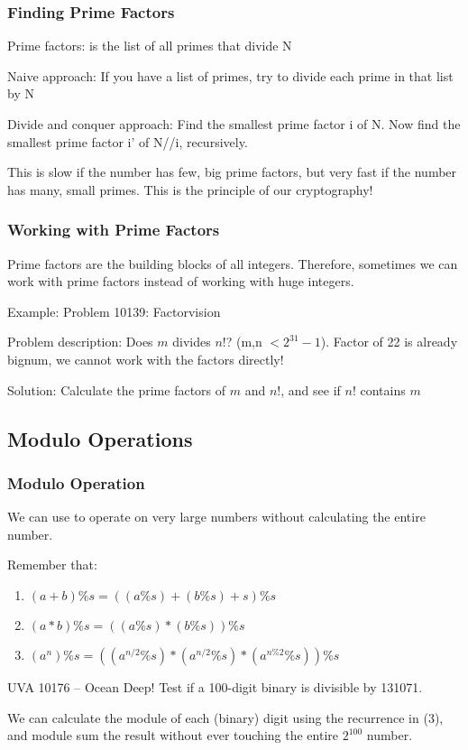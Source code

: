 \documentclass{beamer}
\begin{document}
\begin{frame}
  \frametitle{Finding Prime Factors}

  Prime factors: is the list of all primes that divide N

  Naive approach: If you have a list of primes, try to divide each
  prime in that list by N

  Divide and conquer approach: Find the smallest prime factor i of
  N. Now find the smallest prime factor i' of N//i, recursively.

  This is slow if the number has few, big prime factors, but very fast
  if the number has many, small primes. This is the principle of our
  cryptography!
\end{frame}

\begin{frame}
  \frametitle{Working with Prime Factors}

  Prime factors are the building blocks of all integers. Therefore,
  sometimes we can work with prime factors instead of working with
  huge integers.


  Example: Problem 10139: Factorvision

  Problem description: Does $m$ divides $n!$? (m,n $< 2^{31}-1$).
  Factor of 22 is already bignum, we cannot work with the factors directly!


  Solution: Calculate the prime factors of $m$ and $n!$, and see if $n!$ contains $m$ 

\end{frame}

\subsection{Modulo Operations}
\begin{frame}
  \frametitle{Modulo Operation} 

  {\smaller
  We can use  to operate on very large
  numbers without calculating the entire number.

  Remember that:
  \begin{enumerate}
  \item $(a+b)\%s = ((a\%s)+(b\%s)+s)\%s$
  \item $(a*b)\%s = ((a\%s)*(b\%s))\%s$
  \item $(a^n)\%s = ((a^{n/2}\%s)*(a^{n/2}\%s)*(a^{n\%2}\%s))\%s$
  \end{enumerate}
  
  \begin{block}{UVA 10176 -- Ocean Deep!}
    Test if a 100-digit binary is divisible by 131071.

    \medskip

    We can calculate the module of each (binary) digit using the
    recurrence in (3), and module sum the result without ever touching
    the entire $2^{100}$ number.
  \end{block}}
\end{frame}
\end{document}
